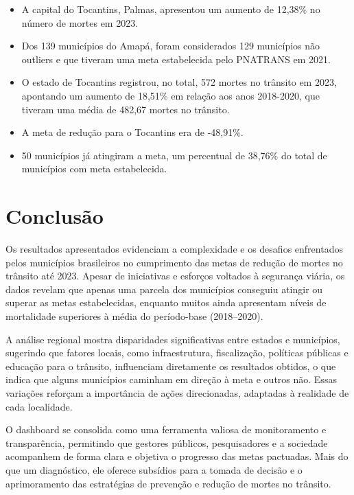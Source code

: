 \documentclass[
  letterpaper,
  DIV=11,
  numbers=noendperiod]{scrreprt}
\begin{document}
\begin{itemize}
\item
  A capital do Tocantins, Palmas, apresentou um aumento de 12,38\% no
  número de mortes em 2023.
\item
  Dos 139 municípios do Amapá, foram considerados 129 municípios não
  outliers e que tiveram uma meta estabelecida pelo PNATRANS em 2021.
\item
  O estado de Tocantins registrou, no total, 572 mortes no trânsito em
  2023, apontando um aumento de 18,51\% em relação aos anos 2018-2020,
  que tiveram uma média de 482,67 mortes no trânsito.
\item
  A meta de redução para o Tocantins era de -48,91\%.
\item
  50 municípios já atingiram a meta, um percentual de 38,76\% do total
  de municípios com meta estabelecida.
\end{itemize}


\chapter{Conclusão}\label{conclusuxe3o}

Os resultados apresentados evidenciam a complexidade e os desafios
enfrentados pelos municípios brasileiros no cumprimento das metas de
redução de mortes no trânsito até 2023. Apesar de iniciativas e esforços
voltados à segurança viária, os dados revelam que apenas uma parcela dos
municípios conseguiu atingir ou superar as metas estabelecidas, enquanto
muitos ainda apresentam níveis de mortalidade superiores à média do
período-base (2018--2020).

A análise regional mostra disparidades significativas entre estados e
municípios, sugerindo que fatores locais, como infraestrutura,
fiscalização, políticas públicas e educação para o trânsito, influenciam
diretamente os resultados obtidos, o que indica que alguns municípios
caminham em direção à meta e outros não. Essas variações reforçam a
importância de ações direcionadas, adaptadas à realidade de cada
localidade.

O dashboard se consolida como uma ferramenta valiosa de monitoramento e
transparência, permitindo que gestores públicos, pesquisadores e a
sociedade acompanhem de forma clara e objetiva o progresso das metas
pactuadas. Mais do que um diagnóstico, ele oferece subsídios para a
tomada de decisão e o aprimoramento das estratégias de prevenção e
redução de mortes no trânsito.
\end{document}
